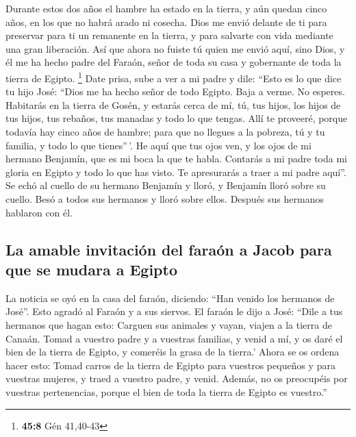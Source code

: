 \begin{paracol}{2}
 Durante estos dos años el hambre ha estado en la tierra,
y aún quedan cinco años, en los que no habrá arado ni cosecha.
 Dios me envió delante de ti para preservar para ti un
remanente en la tierra, y para salvarte con vida mediante una gran
liberación.  Así que ahora no fuiste tú quien me envió
aquí, sino Dios, y él me ha hecho padre del Faraón, señor de toda su
casa y gobernante de toda la tierra de Egipto. \footnote{\textbf{45:8}
  Gén 41,40-43}  Date prisa, sube a ver a mi padre y dile:
``Esto es lo que dice tu hijo José: ``Dios me ha hecho señor de todo
Egipto. Baja a verme. No esperes.  Habitarás en la tierra
de Gosén, y estarás cerca de mí, tú, tus hijos, los hijos de tus hijos,
tus rebaños, tus manadas y todo lo que tengas.  Allí te
proveeré, porque todavía hay cinco años de hambre; para que no llegues a
la pobreza, tú y tu familia, y todo lo que tienes''\,'. 
He aquí que tus ojos ven, y los ojos de mi hermano Benjamín, que es mi
boca la que te habla.  Contarás a mi padre toda mi gloria
en Egipto y todo lo que has visto. Te apresurarás a traer a mi padre
aquí''.  Se echó al cuello de su hermano Benjamín y
lloró, y Benjamín lloró sobre su cuello.  Besó a todos
sus hermanos y lloró sobre ellos. Después sus hermanos hablaron con él.

\hypertarget{la-amable-invitaciuxf3n-del-farauxf3n-a-jacob-para-que-se-mudara-a-egipto}{%
\subsection{La amable invitación del faraón a Jacob para que se mudara a
Egipto}\label{la-amable-invitaciuxf3n-del-farauxf3n-a-jacob-para-que-se-mudara-a-egipto}}

 La noticia se oyó en la casa del faraón, diciendo: ``Han
venido los hermanos de José''. Esto agradó al Faraón y a sus siervos.
 El faraón le dijo a José: ``Dile a tus hermanos que
hagan esto: Carguen sus animales y vayan, viajen a la tierra de Canaán.
 Tomad a vuestro padre y a vuestras familias, y venid a
mí, y os daré el bien de la tierra de Egipto, y comeréis la grasa de la
tierra.'  Ahora se os ordena hacer esto: Tomad carros de
la tierra de Egipto para vuestros pequeños y para vuestras mujeres, y
traed a vuestro padre, y venid.  Además, no os preocupéis
por vuestras pertenencias, porque el bien de toda la tierra de Egipto es
vuestro.''


\end{paracol}
